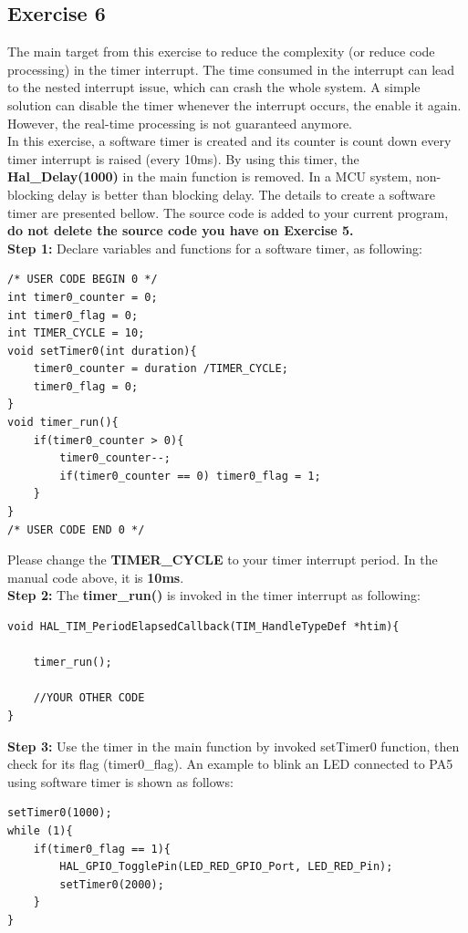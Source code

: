 \subsection{Exercise 6}
The main target from this exercise to reduce the complexity (or reduce code processing) in the timer interrupt. The time consumed in the interrupt can lead to the nested interrupt issue, which can crash the whole system. A simple solution can disable the timer whenever the interrupt occurs, the enable it again. However, the real-time processing is not guaranteed anymore.\\

In this exercise, a software timer is created and its counter is count down every timer interrupt is raised (every 10ms). By using this timer, the \textbf{Hal\_Delay(1000)} in the main function is removed. In a MCU system, non-blocking delay is better than blocking delay. The details to create a software timer are presented bellow. The source code is added to your current program, \textbf{do not delete the source code you have on Exercise 5.}\\

\textbf{Step 1: } Declare variables and functions for a software timer, as following:
\begin{lstlisting}[caption=Software timer based timer interrupt]
/* USER CODE BEGIN 0 */
int timer0_counter = 0;
int timer0_flag = 0;
int TIMER_CYCLE = 10;
void setTimer0(int duration){
	timer0_counter = duration /TIMER_CYCLE;
	timer0_flag = 0;
}
void timer_run(){
	if(timer0_counter > 0){
		timer0_counter--;
		if(timer0_counter == 0) timer0_flag = 1;
	}
}
/* USER CODE END 0 */
\end{lstlisting}

Please change the \textbf{TIMER\_CYCLE} to your timer interrupt period. In the manual code above, it is \textbf{10ms}. \\

\textbf{Step 2: } The \textbf{timer\_run()} is invoked in the timer interrupt as following:

\begin{lstlisting}[caption=Software timer based timer interrupt]
void HAL_TIM_PeriodElapsedCallback(TIM_HandleTypeDef *htim){
	
	timer_run();
	
	//YOUR OTHER CODE
}
\end{lstlisting}

\textbf{Step 3: } Use the timer in the main function by invoked setTimer0 function, then check for its flag (timer0\_flag). An example to blink an LED connected to PA5 using software timer is shown as follows:
\begin{lstlisting}[caption=Software timer is used in main fuction to blink the LED]
setTimer0(1000);
while (1){
    if(timer0_flag == 1){
        HAL_GPIO_TogglePin(LED_RED_GPIO_Port, LED_RED_Pin);
        setTimer0(2000);
    }
}
\end{lstlisting}

